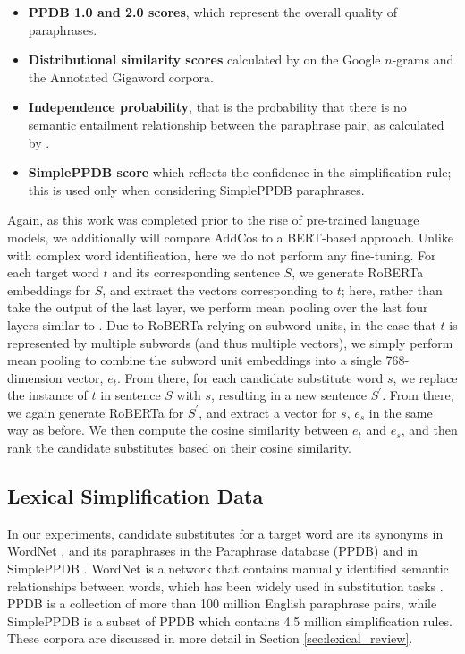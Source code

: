 \documentclass[thesis.tex]{subfiles}
\begin{document}
\begin{itemize}
\item \textbf{PPDB 1.0 and 2.0 scores}, which represent the overall quality of paraphrases.
\item \textbf{Distributional similarity scores} calculated by \cite{ganitkevitch2013ppdb} on the Google $n$-grams and the Annotated Gigaword corpora.
\item \textbf{Independence probability}, that is the probability that there is no semantic entailment relationship between the paraphrase pair, as calculated by \cite{pavlick2015ppdb}.
\item \textbf{SimplePPDB score} \citep{pavlick2016simple} which reflects the confidence in the simplification rule; this is used only when considering SimplePPDB paraphrases.
\end{itemize}

Again, as this work was completed prior to the rise of pre-trained language models, we additionally will compare AddCos to a BERT-based approach. Unlike with complex word identification, here we do not perform any fine-tuning. For each target word $t$ and its corresponding sentence $S$, we generate RoBERTa embeddings for $S$, and extract the vectors corresponding to $t$; here, rather than take the output of the last layer, we perform mean pooling over the last four layers similar to \cite{devlin2019bert}. Due to RoBERTa relying on subword units, in the case that $t$ is represented by multiple subwords (and thus multiple vectors), we simply perform mean pooling to combine the subword unit embeddings into a single 768-dimension vector, $e_t$. From there, for each candidate substitute word $s$, we replace the instance of $t$ in sentence $S$ with $s$, resulting in a new sentence $S^{\prime}$. From there, we again generate RoBERTa for  $S^{\prime}$, and extract a vector for $s$, $e_s$ in the same way as before. We then compute the cosine similarity between $e_t$ and $e_s$, and then rank the candidate substitutes based on their cosine similarity.

\subsection{Lexical Simplification Data}

In our experiments, candidate substitutes for a target word are its synonyms in WordNet \citep{miller1995wordnet}, and its paraphrases in the Paraphrase database (PPDB) \citep{ganitkevitch2013ppdb} and in SimplePPDB \citep{pavlick2016simple}. WordNet is a network that contains manually identified semantic relationships between words, which has been widely used in substitution tasks \citep{mccarthy2007semeval}. PPDB is a collection of more than 100 million English paraphrase pairs, while SimplePPDB is a subset of PPDB which contains 4.5 million simplification rules. These corpora are discussed in more detail in Section \ref{sec:lexical_review}.
\end{document}
